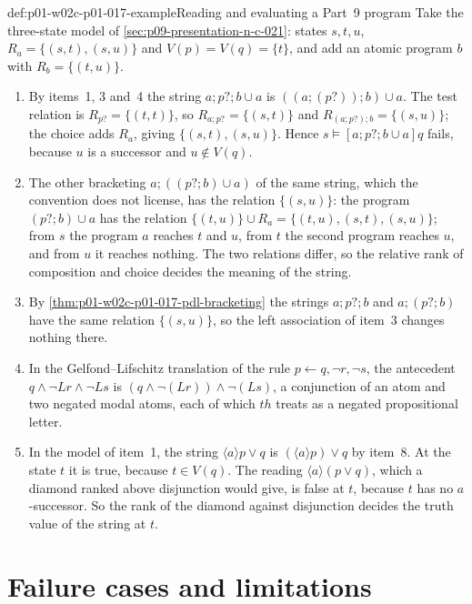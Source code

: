 \begin{hbexample}{def:p01-w02c-p01-017-example}{Reading and evaluating a Part~9 program}
Take the three-state model of \cref{sec:p09-presentation-n-c-021}:
states \(s,t,u\), \(R_a=\{(s,t),(s,u)\}\) and \(V(p)=V(q)=\{t\}\), and add
an atomic program \(b\) with \(R_b=\{(t,u)\}\).
\begin{enumerate}
\item By items~1, 3 and~4 the string \(a;p?;b\cup a\) is
  \(((a;(p?));b)\cup a\).  The test relation is \(R_{p?}=\{(t,t)\}\), so
  \(R_{a;p?}=\{(s,t)\}\) and \(R_{(a;p?);b}=\{(s,u)\}\); the choice adds
  \(R_a\), giving \(\{(s,t),(s,u)\}\).  Hence
  \(s\models[a;p?;b\cup a]q\) fails, because \(u\) is a successor and
  \(u\notin V(q)\).
\item The other bracketing \(a;((p?;b)\cup a)\) of the same string, which
  the convention does not license, has the relation \(\{(s,u)\}\): the
  program \((p?;b)\cup a\) has the relation
  \(\{(t,u)\}\cup R_a=\{(t,u),(s,t),(s,u)\}\); from \(s\) the program \(a\)
  reaches \(t\) and \(u\), from \(t\) the second program reaches \(u\),
  and from \(u\) it reaches nothing.  The two relations differ, so the
  relative rank of composition and choice decides the meaning of the
  string.
\item By \cref{thm:p01-w02c-p01-017-pdl-bracketing} the strings
  \(a;p?;b\) and \(a;(p?;b)\) have the same relation \(\{(s,u)\}\), so the
  left association of item~3 changes nothing there.
\item In the Gelfond--Lifschitz translation of the rule
  \(p\leftarrow q,\neg r,\neg s\), the antecedent
  \(q\land\neg Lr\land\neg Ls\) is \((q\land\neg(Lr))\land\neg(Ls)\), a
  conjunction of an atom and two negated modal atoms, each of which
  \(th\) treats as a negated propositional letter.
\item In the model of item~1, the string \(\langle a\rangle p\lor q\)
  is \((\langle a\rangle p)\lor q\) by item~8.  At the state \(t\) it is
  true, because \(t\in V(q)\).  The reading \(\langle a\rangle(p\lor q)\),
  which a diamond ranked above disjunction would give, is false at \(t\),
  because \(t\) has no \(a\)-successor.  So the rank of the diamond
  against disjunction decides the truth value of the string at \(t\).
\end{enumerate}
\end{hbexample}

\section{Failure cases and limitations}
\label{sec:p01-w02c-p01-017-limits}

